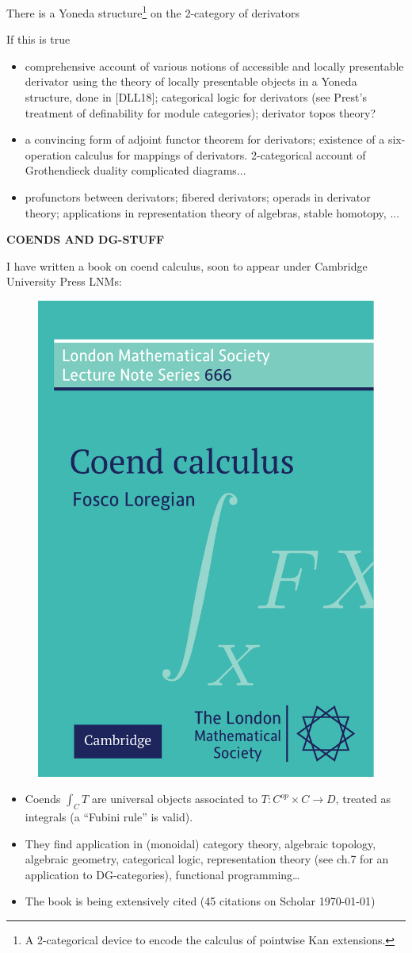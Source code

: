 \documentclass{beamer}
\begin{document}
%
\begin{frame}
  There is a \alert{Yoneda structure}\footnote{A 2-categorical device to encode the calculus of pointwise Kan extensions.} on the 2-category of derivators

  If this is true
\begin{itemize}
\item<2-> comprehensive account of various notions of \alert{accessible} and \alert{locally presentable} derivator using the theory of locally presentable objects in a Yoneda structure, done in [\alert{DLL18}]; categorical logic for derivators (see Prest's treatment of \alert{definability} for module categories); derivator topos theory?
\item<3-> a convincing form of \alert{adjoint functor theorem} for derivators; existence of a six-operation calculus for mappings of derivators. 2-categorical account of Grothendieck duality complicated diagrams...
\item<4-> \alert{profunctors} between derivators; fibered derivators; \alert{operads} in derivator theory; applications in representation theory of algebras, stable homotopy, ...
\end{itemize}
\end{frame}
%
%
%
%
%
%
\begin{frame}
  \Huge\centering \bfseries COENDS AND DG-STUFF
\end{frame}
%
\begin{frame}
  I have written a book on \alert{coend calculus}, soon to appear under Cambridge University Press LNMs:
\begin{figure}
  \includegraphics[width=.35\textwidth]{cover-2-.pdf}
\end{figure}
\small
\begin{itemize}
  \item<+-> Coends $\int_C T$ are universal objects associated to $T : C^{op}\times C \to D$, treated as integrals (a ``Fubini rule'' is valid).
  \item<+-> They find application in (monoidal) category theory, algebraic topology, algebraic geometry, categorical logic, representation theory (see ch.7 for an application to \alert{DG-categories}), functional programming\dots
  \item<+-> The book is being extensively cited (45 citations on Scholar \today)
\end{itemize}
\end{frame}
\end{document}
